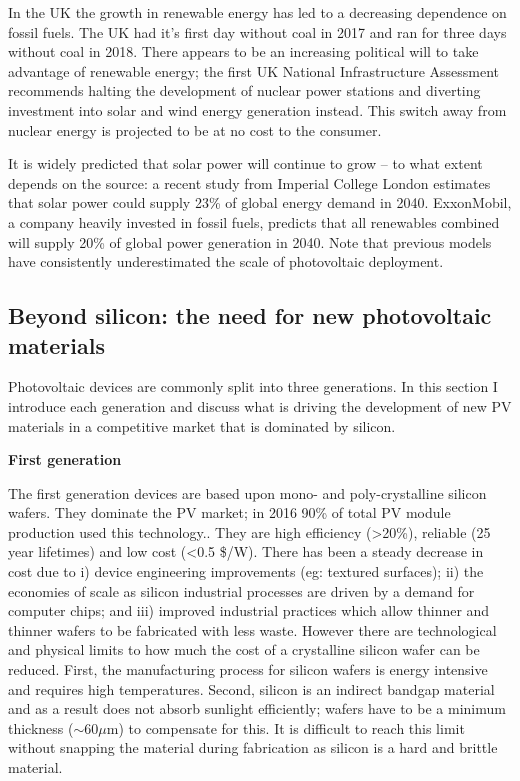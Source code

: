 In the UK the growth in renewable energy has led to a decreasing dependence on fossil fuels. The UK had it's first day without coal in 2017\autocite{Brown2017} and ran for three days without coal in 2018.\autocite{Vaughan2018} There appears to be an increasing political will to take advantage of renewable energy; the first UK National Infrastructure Assessment recommends halting the development of nuclear power stations and diverting investment into solar and wind energy generation instead.\autocite{NIA2018} This switch away from nuclear energy is projected to be at no cost to the consumer.

It is widely predicted that solar power will continue to grow -- to what extent depends on the source: a recent study from Imperial College London estimates that solar power could supply 23\% of global energy demand in 2040.\autocite{Grantham2017} ExxonMobil, a company heavily invested in fossil fuels, predicts that all renewables combined will supply 20\% of global power generation in 2040.\autocite{exxon2018} Note that previous models have consistently underestimated the scale of photovoltaic deployment.\autocite{Creutzig2017}

\subsection{Beyond silicon: the need for new photovoltaic materials}

Photovoltaic devices are commonly split into three generations. In this section I introduce each generation and discuss what is driving the development of new PV materials in a competitive market that is dominated by silicon.
\clearpage

\textbf{First generation}

The first generation devices are based upon mono- and poly-crystalline silicon wafers. They dominate the PV market; in 2016 90\% of total PV module production used this technology.\autocite{Jager-Waldau2017}. They are high efficiency (>20\%), reliable (25 year lifetimes) and low cost (<0.5 \$/W). There has been a steady decrease in cost due to i) device engineering improvements (eg: textured surfaces); ii) the economies of scale as silicon industrial processes are driven by a demand for computer chips; and iii) improved industrial practices which allow thinner and thinner wafers to be fabricated with less waste. However there are technological and physical limits to how much the cost of a crystalline silicon wafer can be reduced. First, the manufacturing process for silicon wafers is energy intensive and requires high temperatures. Second, silicon is an indirect bandgap material and as a result does not absorb sunlight efficiently; wafers have to be a minimum thickness ($\sim 60\mu \textrm{m}$) to compensate for this. It is difficult to reach this limit without snapping the material during fabrication as silicon is a hard and brittle material.

